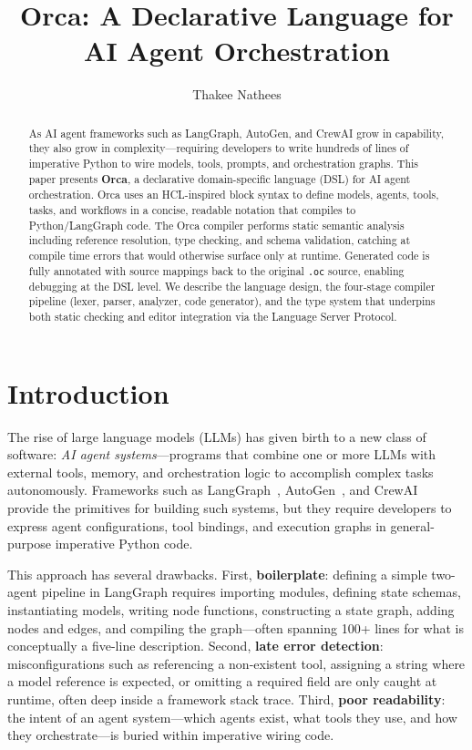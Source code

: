 \documentclass[sigconf,nonacm]{acmart}
\title{Orca: A Declarative Language for AI Agent Orchestration}
\author{Thakee Nathees}
\affiliation{%
  \institution{Curtin University}
  \department{Department of Computing}
  \city{Perth}
  \country{Australia}
}
\begin{document}
\begin{abstract}
As AI agent frameworks such as LangGraph, AutoGen, and CrewAI grow in
capability, they also grow in complexity---requiring developers to write
hundreds of lines of imperative Python to wire models, tools, prompts, and
orchestration graphs. This paper presents \textbf{Orca}, a declarative
domain-specific language (DSL) for AI agent orchestration. Orca uses an
HCL-inspired block syntax to define models, agents, tools, tasks, and
workflows in a concise, readable notation that compiles to
Python/LangGraph code. The Orca compiler performs static semantic analysis
including reference resolution, type checking, and schema validation,
catching at compile time errors that would otherwise surface only at
runtime. Generated code is fully annotated with source mappings back to
the original \texttt{.oc} source, enabling debugging at the DSL level.
We describe the language design, the four-stage compiler pipeline
(lexer, parser, analyzer, code generator), and the type system that
underpins both static checking and editor integration via the Language
Server Protocol.
\end{abstract}

\maketitle

\section{Introduction}
\label{sec:intro}

The rise of large language models (LLMs) has given birth to a new class of
software: \emph{AI agent systems}---programs that combine one or more LLMs
with external tools, memory, and orchestration logic to accomplish complex
tasks autonomously. Frameworks such as LangGraph~\cite{langgraph},
AutoGen~\cite{autogen}, and CrewAI~\cite{crewai} provide the primitives for
building such systems, but they require developers to express agent
configurations, tool bindings, and execution graphs in general-purpose
imperative Python code.

This approach has several drawbacks. First, \textbf{boilerplate}: defining a
simple two-agent pipeline in LangGraph requires importing modules, defining
state schemas, instantiating models, writing node functions, constructing a
state graph, adding nodes and edges, and compiling the graph---often spanning
100+ lines for what is conceptually a five-line description. Second,
\textbf{late error detection}: misconfigurations such as referencing a
non-existent tool, assigning a string where a model reference is expected, or
omitting a required field are only caught at runtime, often deep inside a
framework stack trace. Third, \textbf{poor readability}: the intent of an
agent system---which agents exist, what tools they use, and how they
orchestrate---is buried within imperative wiring code.
\end{document}

